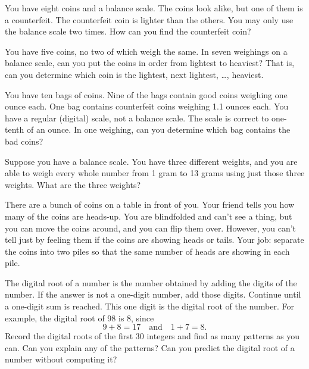 \begin{problem}
You have eight coins and a balance scale.  The coins look alike, but one of them is a counterfeit.  The counterfeit coin is lighter than the others.  You may only use the balance scale two times.  How can you find the counterfeit coin?

\end{problem}



\begin{problem}
You have five coins, no two of which weigh the same.  In seven weighings on a balance scale, can you put the coins in order from lightest to heaviest?  That is, can you determine which  coin is the lightest, next lightest, \dots, heaviest.  
\end{problem}

\begin{problem}
You have ten bags of coins.  Nine of the bags contain good coins weighing one ounce each.  One bag contains counterfeit coins weighing 1.1 ounces each.  You have a regular (digital) scale, not a balance scale.  The scale is correct to one-tenth of an ounce.  In one weighing, can you determine which bag contains the bad coins?
\end{problem}

\begin{problem}
Suppose you have a balance scale.  You have three different weights, and you are able to weigh every whole number from 1 gram to 13 grams using just those three weights.  What are the three weights?  
\end{problem}



\begin{problem}
There are a bunch of coins on a table in front of you.  Your friend tells you how many of the coins are heads-up.  You are blindfolded and can't see a thing, but you can move the coins around, and you can flip them over.  However, you can't tell just by feeling them if the coins are showing heads or tails.  Your job: separate the coins into two piles so that the same number of heads are showing in each pile.
\end{problem}


\begin{problem}
The digital root of a number is the number obtained by adding the digits of the number.  If the answer is not a one-digit number, add those digits.  Continue until a one-digit sum is reached.  This one digit is the digital root of the number.  For example, the digital root of 98 is 8, since 
$$
9+8 = 17 \quad \text{and} \quad 1+7 = 8.
$$
Record the digital roots of the first $30$ integers and find as many  patterns as you can.  Can you explain any of the patterns?  Can you predict the digital root of a number without computing it? 
\end{problem}

